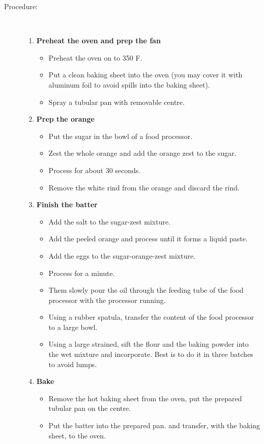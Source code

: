 \documentclass[11pt,letterpaper]{article}
\begin{document}
\begin{description}
\item[Procedure:]\ \\
	\begin{enumerate}
	\item {\bf Preheat the oven and prep the fan}
		\begin{itemize}
		\item Preheat the oven on to 350 F.
		\item Put a clean baking sheet into the oven (you may cover it with aluminum foil to avoid spills into the baking sheet).
		\item Spray a tubular pan with removable centre.
		\end{itemize}
	\item {\bf Prep the orange}
		\begin{itemize}
		\item Put the sugar in the bowl of a food processor.
		\item Zest the whole orange and add the orange zest to the sugar.
		\item Process for about 30 seconds.
		\item Remove the white rind from the orange and discard the rind.
		\end{itemize}
	\item {\bf Finish the batter}
		\begin{itemize}
		\item Add the salt to the sugar-zest mixture.
		\item Add the peeled orange and process until it forms a liquid paste.
		\item Add the eggs to the sugar-orange-zest mixture.
		\item Process for a minute.
		\item Them slowly pour the oil through the feeding tube of the food processor with the processor running.
		\item Using a rubber spatula, transfer the content of the food processor to a large bowl.
		\item Using a large strained, sift the flour and the baking powder into the wet mixture and incorporate. Best is to do it in three batches to avoid lumps.  
		\end{itemize}
	\item {\bf Bake}
		\begin{itemize}
		\item Remove the hot baking sheet from the oven, put the prepared tubular pan on the centre.
		\item Put the batter into the prepared pan. and transfer, with the baking sheet, to the oven.

\end{itemize}
\end{enumerate}
\end{description}
\end{document}
